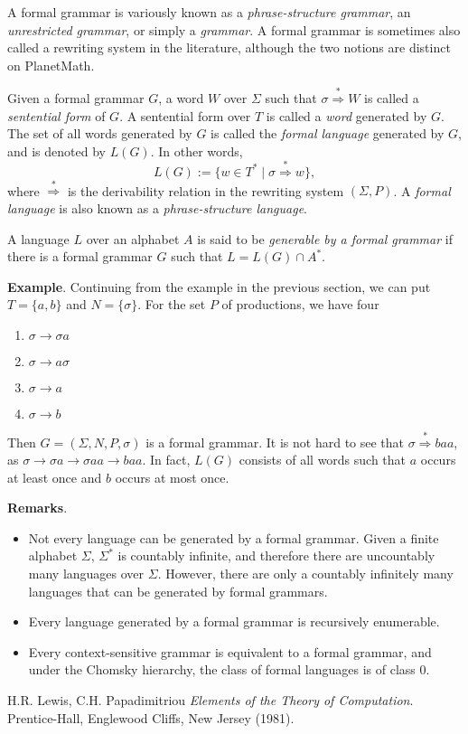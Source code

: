\documentclass[12pt]{article}
\newcommand{\derive}{\stackrel{*}{\Rightarrow}}
\begin{document}
A formal grammar is variously known as a \emph{phrase-structure grammar}, an \emph{unrestricted grammar}, or simply a \emph{grammar}.  A formal grammar is sometimes also called a rewriting system in the literature, although the two notions are distinct on PlanetMath.

Given a formal grammar $G$, a word $W$ over $\Sigma$ such that $\sigma \derive W$ is called a \emph{sentential form} of $G$.  A sentential form over $T$ is called a \emph{word} generated by $G$.  The set of all words generated by $G$ is called the \emph{formal language} generated by $G$, and is denoted by $L(G)$.  In other words,
$$L(G):=\lbrace w\in T^*\mid \sigma \derive w\rbrace,$$ 
where $\derive$ is the derivability relation in the rewriting system $(\Sigma,P)$.  A \emph{formal language} is also known as a \emph{phrase-structure language}.  

A language $L$ over an alphabet $A$ is said to be \emph{generable by a formal grammar} if there is a formal grammar $G$ such that $L=L(G)\cap A^*$.

\textbf{Example}.  Continuing from the example in the previous section, we can put $T=\lbrace a,b\rbrace$ and $N=\lbrace \sigma\rbrace$.  For the set $P$ of productions, we have four 
\begin{enumerate}
\item $\sigma \to \sigma a$
\item $\sigma \to a\sigma$
\item $\sigma \to a$
\item $\sigma \to b$
\end{enumerate}
Then $G=(\Sigma,N,P,\sigma)$ is a formal grammar.  It is not hard to see that $\sigma \derive baa$, as $\sigma \to \sigma a \to \sigma aa \to baa$.  In fact, $L(G)$ consists of all words such that $a$ occurs at least once and $b$ occurs at most once.

\textbf{Remarks}.
\begin{itemize}
\item Not every language can be generated by a formal grammar.  Given a finite alphabet $\Sigma$, $\Sigma^*$ is countably infinite, and therefore there are uncountably many languages over $\Sigma$.  However, there are only a countably infinitely many languages that can be generated by formal grammars.  
\item Every language generated by a formal grammar is recursively enumerable.
\item Every context-sensitive grammar is equivalent to a formal grammar, and under the Chomsky hierarchy, the class of formal languages is of class $0$.
\end{itemize}

\begin{thebibliography}{9}
 H.R. Lewis, C.H. Papadimitriou {\em Elements of the Theory of Computation}. Prentice-Hall, Englewood Cliffs, New Jersey (1981).
\end{thebibliography}
\end{document}
